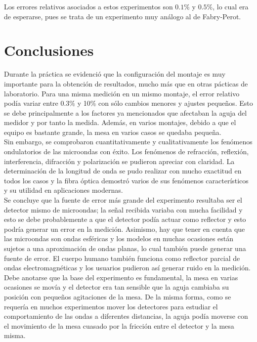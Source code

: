 \documentclass[%
 reprint,
 amsmath,amssymb,
 aps,
]{revtex4-1}
\begin{document}
Los errores relativos asociados a estos experimentos son $0.1\%$ y $0.5\%$, lo cual era de esperarse, pues se trata de un experimento muy análogo al de Fabry-Perot.\\

\section{\label{sec:level1}Conclusiones}
 Durante la práctica se evidenció que la configuración del montaje es muy importante para la obtención de resultados, mucho más que en otras pácticas de laboratorio. Para una misma medición en un mismo montaje, el error relativo podía variar entre 0.3\% y 10\% con sólo cambios menores y ajustes pequeños. Esto se debe principalmente a los factores ya mencionados que afectaban la aguja del medidor y por tanto la medida. Además, en varios montajes, debido a que el equipo es bastante grande, la mesa en varios casos se quedaba pequeña.\\

Sin embargo, se comprobaron cuantitativamente y cualitativamente los fenómenos ondulatorios de las microondas con éxito. Los fenómenos de refracción, reflexión, interferencia, difracción y polarización se pudieron apreciar con claridad. La determinación de la longitud de onda se pudo realizar con mucho exactitud en todos los casos y la fibra óptica demostró varios de sus fenómenos característicos y su utilidad en aplicaciones modernas.\\

Se concluye que la fuente de error más grande del experimento resultaba ser el detector mismo de microondas; la señal recibida variaba con mucha facilidad y esto se debe probablemente a que el detector podía actuar como reflector y esto podría generar un error en la medición. Asimismo, hay que tener en cuenta que las microondas son ondas esféricas y los modelos en muchas ocasiones están sujetos a una aproximación de ondas planas, lo cual también puede generar una fuente de error. El cuerpo humano también funciona como reflector parcial de ondas electromagnéticas y los usuarios pudieron así generar ruido en la medición. \\

Debe anotarse que la base del experimento es fundamental, la mesa en varias ocasiones se movía y el detector era tan sensible que la aguja cambiaba su posición con pequeños agitaciones de la mesa. De la misma forma, como se requería en muchos experimentos mover los detectores para estudiar el comportamiento de las ondas a diferentes distancias, la aguja podía moverse con el movimiento de la mesa cuasado por la fricción entre el detector y la mesa misma. \\
\end{document}
